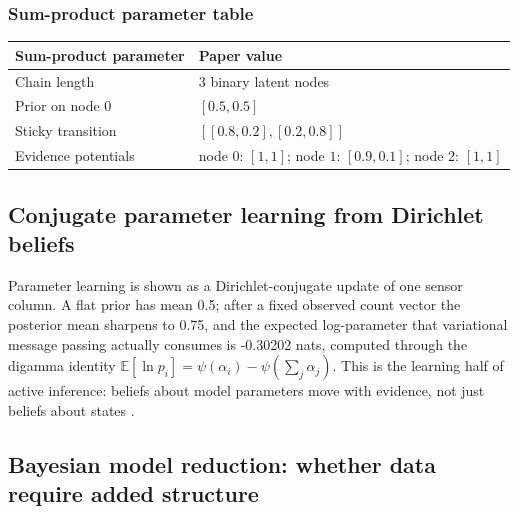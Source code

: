 \documentclass[
  english,
]{article}
\newcounter{none} %
\begin{document}
\subsubsection{Sum-product parameter
table}\label{sum-product-parameter-table}

{\def\LTcaptype{none} %
\begin{longtable}[]{@{}
  >{\raggedright\arraybackslash}p{}
  >{\raggedright\arraybackslash}p{}@{}}
\toprule\noalign{}
\begin{minipage}[b]{\linewidth}\raggedright
Sum-product parameter
\end{minipage} & \begin{minipage}[b]{\linewidth}\raggedright
Paper value
\end{minipage} \\
\midrule\noalign{}
\endhead
\bottomrule\noalign{}
\endlastfoot
Chain length & \(3\) binary latent nodes \\
Prior on node \(0\) & \([0.5,0.5]\) \\
Sticky transition & \([[0.8,0.2],[0.2,0.8]]\) \\
Evidence potentials & node \(0\): \([1,1]\); node \(1\): \([0.9,0.1]\);
node \(2\): \([1,1]\) \\
\end{longtable}
}

\subsection{Conjugate parameter learning from Dirichlet
beliefs}\label{conjugate-parameter-learning-from-dirichlet-beliefs}

Parameter learning is shown as a Dirichlet-conjugate update of one
sensor column. A flat prior has mean 0.5; after a fixed observed count
vector the posterior mean sharpens to 0.75, and the expected
log-parameter that variational message passing actually consumes is
-0.30202 nats, computed through the digamma identity
\(\mathbb{E}[\ln p_i]=\psi(\alpha_i)-\psi(\sum_j\alpha_j)\). This is the
learning half of active inference: beliefs about model parameters move
with evidence, not just beliefs about states
\citep{dacosta2020synthesis}.

\subsection{Bayesian model reduction: whether data require added
structure}\label{bayesian-model-reduction-whether-data-require-added-structure}
\end{document}
